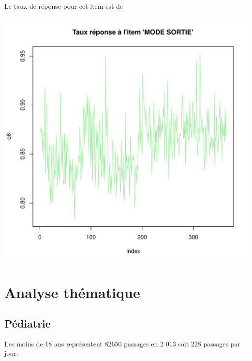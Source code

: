 \documentclass[12pt,english,french,twoside]{book}\usepackage[]{graphicx}\usepackage[]{color}
\makeatletter
\def\maxwidth{ %
  \ifdim\Gin@nat@width>\linewidth
    \linewidth
  \else
    \Gin@nat@width
  \fi
}
\makeatother
\begin{document}
Le taux de réponse pour cet item est de

\includegraphics[width=\maxwidth]{figure/retour_dom3} 




\part{Analyse thématique} 
\newpage

\chapter{Pédiatrie}

\label{chap_pediatrie}




Les moins de 18 ans représentent $82 650$ passages en 2 013 soit $228$ passages par jour.

\end{document}
